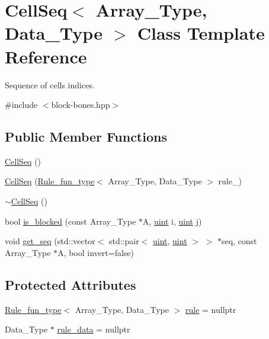 \hypertarget{class_cell_seq}{}\section{Cell\+Seq$<$ Array\+\_\+\+Type, Data\+\_\+\+Type $>$ Class Template Reference}
\label{class_cell_seq}


Sequence of cells indices.  




{\ttfamily \#include $<$block-\/bones.\+hpp$>$}

\subsection*{Public Member Functions}
\begin{DoxyCompactItemize}
\item 
\hyperlink{class_cell_seq_a1668f6f6768838864d1a85f018be2aa6}{Cell\+Seq} ()
\item 
\hyperlink{class_cell_seq_aa08a1ebbb81673baea62c9eb91946f4d}{Cell\+Seq} (\hyperlink{typedefs_8hpp_a2e147c9c0e8b65be614c98a5dd400d5c}{Rule\+\_\+fun\+\_\+type}$<$ Array\+\_\+\+Type, Data\+\_\+\+Type $>$ rule\+\_\+)
\item 
\hyperlink{class_cell_seq_aa52be587e92f0d246bd84980c3e8b540}{$\sim$\+Cell\+Seq} ()
\item 
bool \hyperlink{class_cell_seq_a32d85d2f118a68b58d1f7a6095ff42ca}{is\+\_\+blocked} (const Array\+\_\+\+Type $\ast$A, \hyperlink{typedefs_8hpp_a91ad9478d81a7aaf2593e8d9c3d06a14}{uint} i, \hyperlink{typedefs_8hpp_a91ad9478d81a7aaf2593e8d9c3d06a14}{uint} j)
\item 
void \hyperlink{class_cell_seq_a844b28a2053fd2c6810340a5a9aef945}{get\+\_\+seq} (std\+::vector$<$ std\+::pair$<$ \hyperlink{typedefs_8hpp_a91ad9478d81a7aaf2593e8d9c3d06a14}{uint}, \hyperlink{typedefs_8hpp_a91ad9478d81a7aaf2593e8d9c3d06a14}{uint} $>$ $>$ $\ast$seq, const Array\+\_\+\+Type $\ast$A, bool invert=false)
\end{DoxyCompactItemize}
\subsection*{Protected Attributes}
\begin{DoxyCompactItemize}
\item 
\hyperlink{typedefs_8hpp_a2e147c9c0e8b65be614c98a5dd400d5c}{Rule\+\_\+fun\+\_\+type}$<$ Array\+\_\+\+Type, Data\+\_\+\+Type $>$ \hyperlink{class_cell_seq_a96562d860b3e66a90330854ff9184ba5}{rule} = nullptr
\item 
Data\+\_\+\+Type $\ast$ \hyperlink{class_cell_seq_a543981f0422f690a3c52da29f82d8e0e}{rule\+\_\+data} = nullptr
\end{DoxyCompactItemize}


